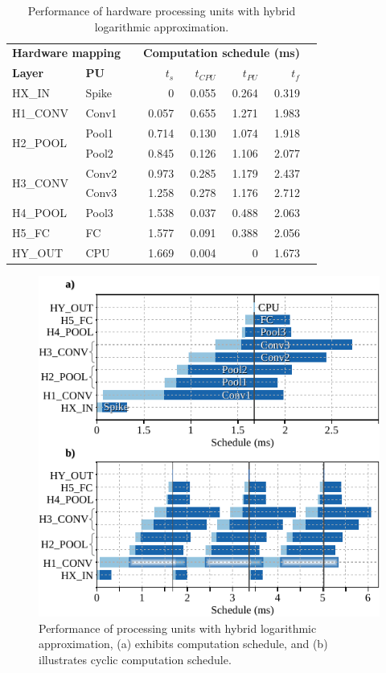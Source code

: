 \begin{table}[t!]\centering
	\caption{Performance of hardware processing units with hybrid logarithmic approximation.}\label{tab:latency_log}
	\scriptsize
	\begin{tabular}{llrrrrrr}\toprule
		\multicolumn{2}{c}{\textbf{Hardware mapping}} & &\multicolumn{4}{c}{\textbf{Computation schedule (ms)}} \\\cmidrule{1-2}\cmidrule{4-7}
		\textbf{Layer} &\textbf{PU} & &$t_s$ &$t_{CPU}$ &$t_{PU}$ &$t_f$ \\\midrule
		HX\_IN &Spike & &0 &0.055 &0.264 &0.319 \\
		H1\_CONV &Conv1 & &0.057 &0.655 &1.271 &1.983 \\
		\multirow{2}{*}{H2\_POOL} &Pool1 & &0.714 &0.130 &1.074 &1.918 \\
		&Pool2 & &0.845 &0.126 &1.106 &2.077 \\
		\multirow{2}{*}{H3\_CONV} &Conv2 & &0.973 &0.285 &1.179 &2.437 \\
		&Conv3 & &1.258 &0.278 &1.176 &2.712 \\
		H4\_POOL &Pool3 & &1.538 &0.037 &0.488 &2.063 \\
		H5\_FC &FC & &1.577 &0.091 &0.388 &2.056 \\
		HY\_OUT &CPU & &1.669 &0.004 &0 &1.673 \\
		\bottomrule
	\end{tabular}
\end{table}

\begin{figure}[!t]
	\centering
	\includegraphics[width=1\columnwidth]{../figures/latency_log_cycle.pdf}
	\caption{Performance of processing units with hybrid logarithmic approximation, (a) exhibits computation schedule, and (b) illustrates cyclic computation schedule.}
	\label{fig:latency_pu_log_cycle}
\end{figure}

